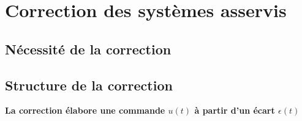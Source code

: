 \chapter{Correction des systèmes asservis\label{chap-correc}}
\minitoc
\newpage
\section{Nécessité de la correction}

\section{Structure de la correction}
\textbf{La correction élabore une commande $u(t)$ à partir d'un écart 
$\epsilon(t)$}
\begin{center}
    
\end{center}
